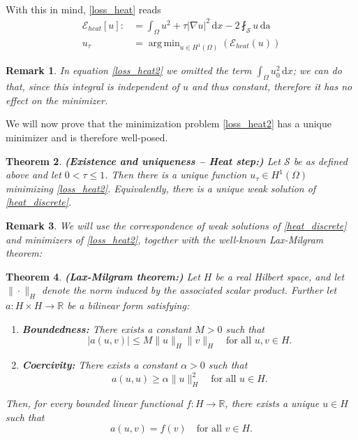 \documentclass[12pt,openany]{book}
\newcommand{\R}{\mathbb{R}}
\theoremstyle{plainnormal}
\newtheorem{theorem}{Theorem}[section]
\newtheorem{remark}[theorem]{Remark}
\theoremstyle{remark}
\DeclareMathOperator*{\argmin}{arg\,min}
\begin{document}
\\
With this in mind, \cref{loss_heat} reads
\begin{align}\label{loss_heat2}
    \mathcal{E}_{heat}[u] :&= \int_\Omega u^2 + \tau |\nabla u|^2 \,\mathrm{d}x - 2\fint_\mathcal{S} u \, \mathrm{da}\\
    u_\tau &= \argmin_{u\in H^1(\Omega)} (\mathcal{E}_{heat}(u))
\end{align}
\begin{remark}
    In equation \eqref{loss_heat2} we omitted the term $\int_\Omega u_0 ^2 \,\mathrm{d}x$; we can do that, since this integral is independent of $u$ and thus constant, therefore it has no effect on the minimizer. 
\end{remark}
We will now prove that the minimization problem \cref{loss_heat2} has a unique minimizer and is therefore well-posed.
\begin{theorem}\label{thm_exUniq_heat}{\textbf{(Existence and uniqueness -- Heat step:)}}
Let $\mathcal{S}$ be as defined above and let $0 < \tau \leq 1$. Then there is a unique function $u_\tau \in H^1(\Omega)$ minimizing \cref{loss_heat2}. Equivalently, there is a unique weak solution of \eqref{heat_discrete}.
\end{theorem}
\begin{remark}
We will use the correspondence of weak solutions of \cref{heat_discrete} and minimizers of \cref{loss_heat2}, together with the well-known Lax-Milgram theorem:
\end{remark}
\begin{theorem}\textbf{(Lax-Milgram theorem:)}
    Let \( H \) be a real Hilbert space, and let $\|\cdot\|_H$ denote the norm induced by the associated scalar product. Further let \( a : H \times H \to \mathbb{R} \) be a bilinear form satisfying:
\begin{enumerate}
  \item \textbf{Boundedness:} There exists a constant \( M > 0 \) such that
  \[
  |a(u, v)| \leq M \|u\|_H \|v\|_H \quad \text{for all } u, v \in H.
  \]
  
  \item \textbf{Coercivity:} There exists a constant \( \alpha > 0 \) such that
  \[
  a(u, u) \geq \alpha \|u\|_H^2 \quad \text{for all } u \in H.
  \]
\end{enumerate}
Then, for every bounded linear functional \( f : H \rightarrow\R \), there exists a unique \( u \in H \) such that
\[
a(u, v) = f(v) \quad \text{for all } v \in H.
\]
\end{theorem}
\end{document}
